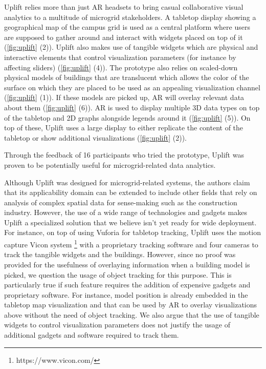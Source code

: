\documentclass{vgtc}                          %
\begin{document}
\medskip

\noindent Uplift relies more than just AR headsets to bring casual
collaborative visual analytics to a multitude of microgrid stakeholders.
A tabletop display showing a geographical map of the campus grid is used as a
central platform where users are supposed to gather around and interact with
widgets placed on top of it (\cref{fig:uplift} (2)). Uplift also makes use of
tangible widgets which are physical and interactive elements that control
visualization parameters (for instance by affecting sliders) (\cref{fig:uplift}
(4)). The prototype also relies on scaled-down physical models of buildings
that are translucent which allows the color of the surface on which they are
placed to be used as an appealing visualization channel
(\cref{fig:uplift} (1)). If these models are picked up, AR will overlay
relevant data about them (\cref{fig:uplift} (6)). AR is used to display
multiple 3D data types on top of the tabletop and 2D graphs alongside legends
around it (\cref{fig:uplift} (5)). On top of these, Uplift uses a large display
to either replicate the content of the tabletop or show additional
visualizations (\cref{fig:uplift} (2)).

\medskip

\noindent Through the feedback of 16 participants who tried the prototype,
Uplift was proven to be potentially useful for microgrid-related data
analytics.

\medskip

\noindent Although Uplift was designed for microgrid-related systems,
the authors claim that its applicability domain can be extended to include
other fields that rely on analysis of complex spatial data for sense-making
such as the construction industry. However, the use of a wide range of technologies
and gadgets makes Uplift a specialized solution that we believe isn't yet
ready for wide deployment. For instance, on top of using Vuforia for tabletop
tracking, Uplift uses the motion capture Vicon system
\footnote{https://www.vicon.com/} with a proprietary tracking software and four
cameras to track the tangible widgets and the buildings. However,
since no proof was provided for the usefulness of overlaying information when
a building model is picked, we question the usage of object tracking for this
purpose. This is particularly true if such feature requires the addition of
expensive gadgets and proprietary software. For instance, model position is
already embedded in the tabletop map visualization and that can be used by AR
to overlay visualizations above without the need of object tracking. We also
argue that the use of tangible widgets to control visualization parameters does
not justify the usage of additional gadgets and software required to track
them.
\end{document}
